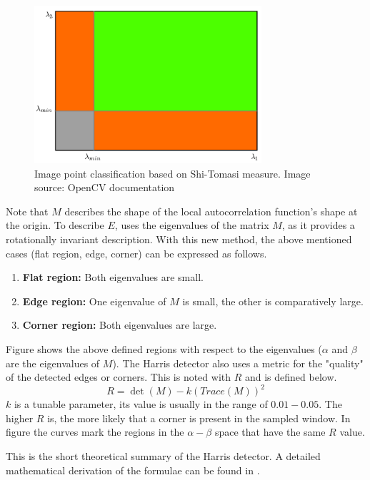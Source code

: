 \begin{figure}[t]
	\centering
	\includegraphics[width=0.75\textwidth]{figures/shitomasi_space.png}
	\caption{Image point classification based on Shi-Tomasi measure. Image source: OpenCV documentation}
	\label{fig:shiTomasiMeasure}
\end{figure}

Note that $M$ describes the shape of the local autocorrelation function's shape at the origin.
To describe $E$, \cite{Harris88alvey} uses the eigenvalues of the matrix $M$, as it provides a rotationally invariant description.
With this new method, the above mentioned cases (flat region, edge, corner) can be expressed as follows.
\begin{enumerate}
	\item \textbf{Flat region:} Both eigenvalues are small.
	\item \textbf{Edge region:} One eigenvalue of $M$ is small, the other is comparatively large.
	\item \textbf{Corner region:} Both eigenvalues are large.
\end{enumerate}
Figure  shows the above defined regions with respect to the eigenvalues ($\alpha$ and $\beta$ are the eigenvalues of $M$).
The Harris detector also uses a metric for the "quality" of the detected edges or corners.
This is noted with $R$ and is defined below.
\begin{equation}
R = \det(M) - k(Trace(M))^2
\end{equation}
$k$ is a tunable parameter, its value is usually in the range of $0.01-0.05$.
The higher $R$ is, the more likely that a corner is present in the sampled window.
In figure  the curves mark the regions in the $\alpha-\beta$ space that have the same $R$ value.

This is the short theoretical summary of the Harris detector.
A detailed mathematical derivation of the formulae can be found in \cite{Harris88alvey}.

